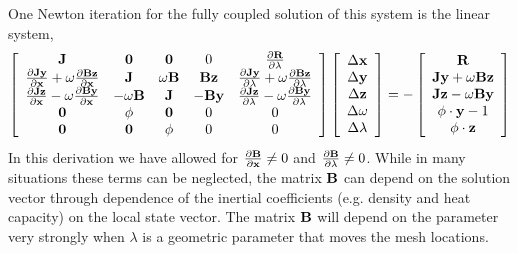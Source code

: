 One Newton iteration for the fully coupled solution of this system is the linear system,
\begin{equation}
\label{eq:hpn}
\begin{split}
\left[\begin{array}{ccccc}
{\bf J} & {\bf 0} & {\bf 0} & 0 & \frac{\partial {\bf R}}{\partial \lambda} \\
\frac{\partial {\bf J} {\bf y}}{\partial {\bf x}} + \omega \frac{\partial {\bf B} {\bf z}}{\partial {\bf x}} & {\bf J} & \omega {\bf B} & {\bf B} {\bf z} & \frac{\partial {\bf J} {\bf y}}{\partial \lambda} + \omega \frac{\partial {\bf B} {\bf z}}{\partial \lambda}\\
\frac{\partial {\bf J} {\bf z}}{\partial {\bf x}} - \omega \frac{\partial {\bf B} {\bf y}}{\partial {\bf x}} & -\omega {\bf B} & {\bf J} & - {\bf B} {\bf y} & \frac{\partial {\bf J} {\bf z}}{\partial \lambda} - \omega \frac{\partial {\bf B} {\bf y}}{\partial \lambda}\\
{\bf 0} & \phi & {\bf 0} & 0 & 0 \\
{\bf 0} & {\bf 0} & \phi & 0 & 0 
\end{array}\right]
\left[\begin{array}{c}
\Delta{\bf x} \\
\Delta{\bf y} \\
\Delta{\bf z} \\
\Delta\omega \\
\Delta\lambda
\end{array}\right]
= -
\left[\begin{array}{c}
{\bf R} \\
{\bf J} {\bf y} + \omega {\bf B} {\bf z}\\
{\bf J} {\bf z} - \omega {\bf B} {\bf y}\\
\phi \cdot {\bf y} - 1 \\
\phi \cdot {\bf z}
\end{array}\right]
\end{split}
\end{equation}
In this derivation we have allowed for $\frac{\partial {\bf B}}{\partial {\bf x}} \neq 0$ and $\frac{\partial {\bf B}}{\partial \lambda} \neq 0$. While in many situations these terms can be neglected, the matrix ${\bf B}$ can depend on the solution vector through dependence of the inertial coefficients (e.g. density and heat capacity) on the local state vector. The matrix ${\bf B}$ will depend on the parameter very strongly when $\lambda$ is a geometric parameter that moves the mesh locations. 


